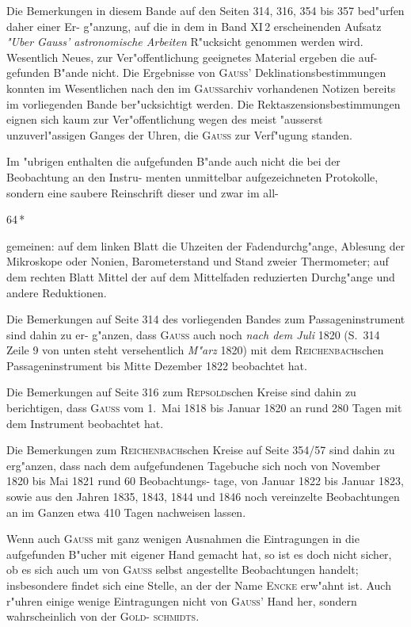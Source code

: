\documentclass[12pt,a4paper]{article}
\theoremstyle{plain}
\theoremstyle{definition}
\theoremstyle{remark}
\begin{document}
Die Bemerkungen in diesem Bande auf den Seiten 314, 316, 354 bis 357 bed"urfen daher einer Er-
g"anzung, auf die in dem in Band XI\,2 erscheinenden Aufsatz \textit{"Uber Gauss' astronomische Arbeiten} R"ucksicht
genommen werden wird. Wesentlich Neues, zur Ver"offentlichung geeignetes Material ergeben die auf-
gefunden B"ande nicht. Die Ergebnisse von \textsc{Gauss}' Deklinationsbestimmungen konnten im Wesentlichen
nach den im \textsc{Gauss}archiv vorhandenen Notizen bereits im vorliegenden Bande ber"ucksichtigt werden. Die
Rektaszensionsbestimmungen eignen sich kaum zur Ver"offentlichung wegen des meist "ausserst unzuverl"assigen
Ganges der Uhren, die \textsc{Gauss} zur Verf"ugung standen.

Im "ubrigen enthalten die aufgefunden B"ande auch nicht die bei der Beobachtung an den Instru-
menten unmittelbar aufgezeichneten Protokolle, sondern eine saubere Reinschrift dieser und zwar im all-

\begin{flushright}
64\,*
\end{flushright}

gemeinen: auf dem linken Blatt die Uhzeiten der Fadendurchg"ange, Ablesung der Mikroskope oder Nonien,
Barometerstand und Stand zweier Thermometer; auf dem rechten Blatt Mittel der auf dem Mittelfaden
reduzierten Durchg"ange und andere Reduktionen.

Die Bemerkungen auf Seite 314 des vorliegenden Bandes zum Passageninstrument sind dahin zu er-
g"anzen, dass \textsc{Gauss} auch noch \textit{nach dem Juli} 1820 (S.~314 Zeile 9 von unten steht versehentlich \textit{M"arz}
1820) mit dem \textsc{Reichenbach}schen Passageninstrument bis Mitte Dezember 1822 beobachtet hat.

Die Bemerkungen auf Seite 316 zum \textsc{Repsold}schen Kreise sind dahin zu berichtigen, dass \textsc{Gauss}
vom 1.\ Mai 1818 bis Januar 1820 an rund 280 Tagen mit dem Instrument beobachtet hat.

Die Bemerkungen zum \textsc{Reichenbach}schen Kreise auf Seite 354/57 sind dahin zu erg"anzen, dass
nach dem aufgefundenen Tagebuche sich noch von November 1820 bis Mai 1821 rund 60 Beobachtungs-
tage, von Januar 1822 bis Januar 1823, sowie aus den Jahren 1835, 1843, 1844 und 1846 noch vereinzelte
Beobachtungen an im Ganzen etwa 410 Tagen nachweisen lassen.

Wenn auch \textsc{Gauss} mit ganz wenigen Ausnahmen die Eintragungen in die aufgefunden B"ucher mit
eigener Hand gemacht hat, so ist es doch nicht sicher, ob es sich auch um von \textsc{Gauss} selbst angestellte
Beobachtungen handelt; insbesondere findet sich eine Stelle, an der der Name \textsc{Encke} erw"ahnt ist. Auch
r"uhren einige wenige Eintragungen nicht von \textsc{Gauss}' Hand her, sondern wahrscheinlich von der \textsc{Gold}-
\textsc{schmidts}.
\end{document}
